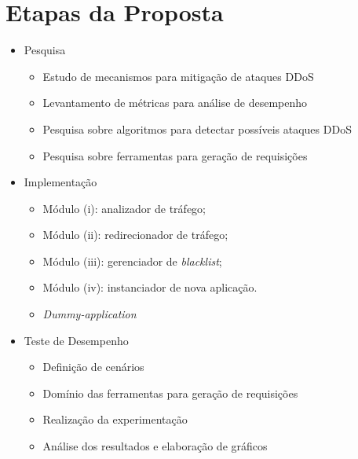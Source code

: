 \documentclass[a4paper, 11pt]{article}
\begin{document}
\section{Etapas da Proposta}
\begin{itemize}
 \item Pesquisa
  \begin{itemize}
    \item Estudo de mecanismos para mitiga\c{c}\~{a}o de ataques DDoS
	\item Levantamento de métricas para análise de desempenho
	\item Pesquisa sobre algoritmos para detectar possíveis ataques DDoS
	\item Pesquisa sobre ferramentas para geração de requisições
  \end{itemize}

 \item Implementa\c{c}\~{a}o
  \begin{itemize}
      \item Módulo (i): analizador de tráfego;
	  \item Módulo (ii): redirecionador de tráfego;
	  \item Módulo (iii): gerenciador de \emph{blacklist};
	  \item Módulo (iv): instanciador de nova aplica\c{c}\~{a}o.
	  \item \emph{Dummy-application}
  \end{itemize}

 \item Teste de Desempenho 
  \begin{itemize}
    \item Definição de cenários
	\item Domínio das ferramentas para geração de requisições
	\item Realização da experimentação
	\item Análise dos resultados e elaboração de gráficos
  \end{itemize}
\end{itemize}




\end{document}
